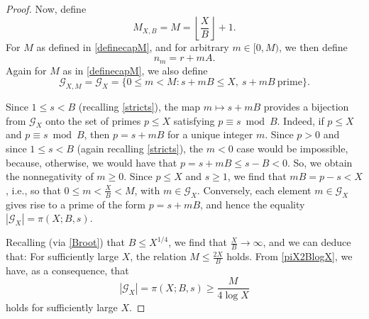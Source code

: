 \documentclass[12pt]{article}
\begin{document}
\begin{proof}
 Now, define 
\begin{equation}\label{definecapM}
 M_{X, B} = M = \left\lfloor \frac{X}{B} \right\rfloor + 1. 
\end{equation}
 For $M$ as defined in \eqref{definecapM}, and for arbitrary $m \in [0, M)$, 
 we then define 
\begin{equation}\label{nmwithoutp} 
 n_m = r + m A. 
\end{equation}
 Again for $M$ as in \eqref{definecapM}, we also define 
\begin{equation}\label{mathcalG}
 \mathcal{G}_{X, M} = \mathcal{G}_{X} = \{ 0 \leq m < M : s + m B \leq X, \ s + m B \ \text{prime} \}. 
\end{equation}

 Since $1 \leq s < B$ (recalling \eqref{stricts}), the map $m \mapsto s + m B$ provides a bijection from $\mathcal{G}_{X}$ onto the set of 
 primes $p \leq X$ satisfying $p \equiv s \bmod B$. Indeed,
 if $p \leq X $ and $p \equiv s \bmod B$, then $p = s + m B$ for a unique integer $m$.
 Since $p > 0$ and since $1 \leq s < B$ (again recalling \eqref{stricts}),
 the $m < 0$ case would be impossible, because, otherwise, 
 we would have that $p = s + m B \leq s - B < 0$. 
 So, we obtain the nonnegativity of $m \geq 0$.
 Since $p \leq X$ and $s \geq 1$, we find that
 $m B = p - s < X$, i.e., so that 
 $0 \leq m < \frac{X}{B} < M$, with $m \in \mathcal{G}_{X}$. 
 Conversely, each element $m \in \mathcal{G}_{X}$ gives rise to a prime of the form $p = s + m B$, 
 and hence the equality $|\mathcal{G}_{X}| = \pi(X;B,s)$. 
 
 Recalling (via \eqref{Broot}) that $B \leq X^{1/4}$, we find that $\frac{X}{B} \to \infty$, and we can deduce that: For sufficiently large $X$, 
 the relation $ M \leq \frac{2X}{B} $ holds. From \eqref{piX2BlogX}, we have, as a consequence, that 
\begin{equation}\label{Mover4logX}
 |\mathcal{G}_{X}| = \pi(X; B, s) \geq \frac{M}{4 \log X} 
\end{equation}
 holds for sufficiently large $X$. 
 

\end{proof}
\end{document}
